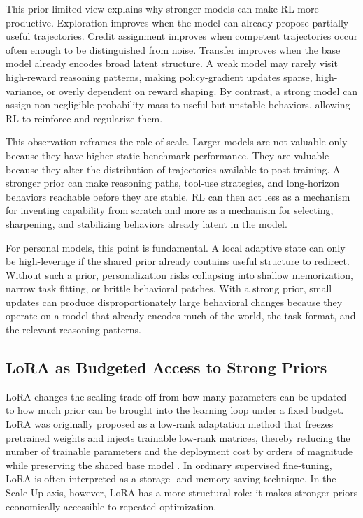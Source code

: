 \documentclass{llmxive}
\begin{document}
This prior-limited view explains why stronger models can make RL more productive. Exploration improves when the model can already propose partially useful trajectories. Credit assignment improves when competent trajectories occur often enough to be distinguished from noise. Transfer improves when the base model already encodes broad latent structure. A weak model may rarely visit high-reward reasoning patterns, making policy-gradient updates sparse, high-variance, or overly dependent on reward shaping. By contrast, a strong model can assign non-negligible probability mass to useful but unstable behaviors, allowing RL to reinforce and regularize them.

This observation reframes the role of scale. Larger models are not valuable only because they have higher static benchmark performance. They are valuable because they alter the distribution of trajectories available to post-training. A stronger prior can make reasoning paths, tool-use strategies, and long-horizon behaviors reachable before they are stable. RL can then act less as a mechanism for inventing capability from scratch and more as a mechanism for selecting, sharpening, and stabilizing behaviors already latent in the model.

For personal models, this point is fundamental. A local adaptive state can only be high-leverage if the shared prior already contains useful structure to redirect. Without such a prior, personalization risks collapsing into shallow memorization, narrow task fitting, or brittle behavioral patches. With a strong prior, small updates can produce disproportionately large behavioral changes because they operate on a model that already encodes much of the world, the task format, and the relevant reasoning patterns.

\subsection{LoRA as Budgeted Access to Strong Priors}\label{subsec:lora-budgeted-prior}

LoRA changes the scaling trade-off from how many parameters can be updated to how much prior can be brought into the learning loop under a fixed budget. LoRA was originally proposed as a low-rank adaptation method that freezes pretrained weights and injects trainable low-rank matrices, thereby reducing the number of trainable parameters and the deployment cost by orders of magnitude while preserving the shared base model \citep{hu2021lora}. In ordinary supervised fine-tuning, LoRA is often interpreted as a storage- and memory-saving technique. In the Scale Up axis, however, LoRA has a more structural role: it makes stronger priors economically accessible to repeated optimization.
\end{document}
